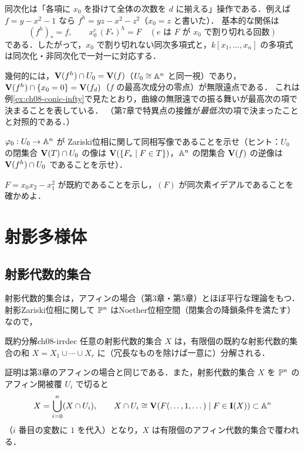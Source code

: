 同次化は「各項に $x_0$ を掛けて全体の次数を $d$ に揃える」操作である．例えば $f=y-x^2-1$ なら $f^h=yz-x^2-z^2$（$x_0=z$ と書いた）．
基本的な関係は
\[
  (f^h)_*=f,\qquad x_0^e\,(F_*)^h=F\quad(e\text{ は }F\text{ が }x_0\text{ で割り切れる回数})
\]
である．したがって，$x_0$ で割り切れない同次多項式と，$k[x_1,\dots,x_n]$ の多項式は同次化・非同次化で一対一に対応する．

幾何的には，$\mathbf{V}(f^h)\cap U_0=\mathbf{V}(f)$（$U_0\cong\mathbb{A}^n$ と同一視）であり，$\mathbf{V}(f^h)\cap\{x_0=0\}=\mathbf{V}(f_d)$（$f$ の最高次成分の零点）が無限遠点である．
これは例\ref{ex:ch08-conic-infty}で見たとおり，曲線の無限遠での振る舞いが最高次の項で決まることを表している．
（第7章で特異点の接錐が\emph{最低次}の項で決まったことと対照的である．）

$\varphi_0:U_0\to\mathbb{A}^n$ が Zariski位相に関して同相写像であることを示せ（ヒント：$U_0$ の閉集合 $\mathbf{V}(T)\cap U_0$ の像は $\mathbf{V}(\{F_*\mid F\in T\})$，$\mathbb{A}^n$ の閉集合 $\mathbf{V}(f)$ の逆像は $\mathbf{V}(f^h)\cap U_0$ であることを示せ）．

$F=x_0x_2-x_1^2$ が既約であることを示し，$(F)$ が同次素イデアルであることを確かめよ．

\section{射影多様体}

\subsection{射影代数的集合}

射影代数的集合は，アフィンの場合（第3章・第5章）とほぼ平行な理論をもつ．
射影Zariski位相に関して $\mathbb{P}^n$ はNoether位相空間（閉集合の降鎖条件を満たす）なので，

\begin{myprop}{既約分解}{ch08-irrdec}
任意の射影代数的集合 $X$ は，有限個の既約な射影代数的集合の和 $X=X_1\cup\cdots\cup X_r$ に（冗長なものを除けば一意に）分解される．
\end{myprop}

証明は第3章のアフィンの場合と同じである．また，射影代数的集合 $X$ を $\mathbb{P}^n$ のアフィン開被覆 $U_i$ で切ると
\[
  X=\bigcup_{i=0}^n(X\cap U_i),\qquad X\cap U_i\cong\mathbf{V}(F(\dots,1,\dots)\mid F\in\mathbf{I}(X))\subset\mathbb{A}^n
\]
（$i$ 番目の変数に $1$ を代入）となり，$X$ は有限個のアフィン代数的集合で覆われる．

